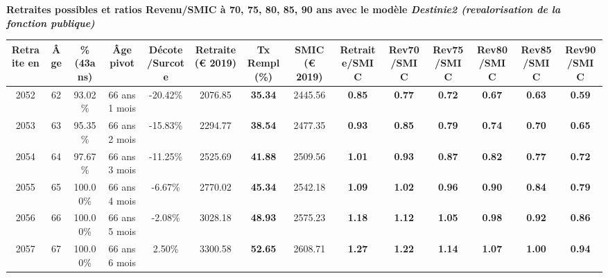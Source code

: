  \vspace{0.1cm} 
{\bf \noindent Retraites possibles et ratios Revenu/SMIC à 70, 75, 80, 85, 90 ans avec le modèle \emph{Destinie2 (revalorisation de la fonction publique)}}  
 
\begin{adjustbox}{max width=\textwidth} 
\begin{tabular}[htb]{|c|c||c|c|c||c|c||c||c|c|c|c|c|c|} 
\hline 
 Retraite en &  Âge &  \%(43ans) &  Âge pivot &  Décote/Surcote &  Retraite (\euro{} 2019) &  Tx Rempl(\%) &  SMIC (\euro{} 2019) &  Retraite/SMIC &  Rev70/SMIC &  Rev75/SMIC &  Rev80/SMIC &  Rev85/SMIC &  Rev90/SMIC \\ 
\hline \hline 
 2052 &  62 &  93.02\% &  66 ans 1 mois &  -20.42\% &  2076.85 &  {\bf 35.34} &  2445.56 &  {\bf {\color{red} 0.85}} &  {\bf {\color{red} 0.77}} &  {\bf {\color{red} 0.72}} &  {\bf {\color{red} 0.67}} &  {\bf {\color{red} 0.63}} &  {\bf {\color{red} 0.59}} \\ 
\hline 
 2053 &  63 &  95.35\% &  66 ans 2 mois &  -15.83\% &  2294.77 &  {\bf 38.54} &  2477.35 &  {\bf {\color{red} 0.93}} &  {\bf {\color{red} 0.85}} &  {\bf {\color{red} 0.79}} &  {\bf {\color{red} 0.74}} &  {\bf {\color{red} 0.70}} &  {\bf {\color{red} 0.65}} \\ 
\hline 
 2054 &  64 &  97.67\% &  66 ans 3 mois &  -11.25\% &  2525.69 &  {\bf 41.88} &  2509.56 &  {\bf 1.01} &  {\bf {\color{red} 0.93}} &  {\bf {\color{red} 0.87}} &  {\bf {\color{red} 0.82}} &  {\bf {\color{red} 0.77}} &  {\bf {\color{red} 0.72}} \\ 
\hline 
 2055 &  65 &  100.00\% &  66 ans 4 mois &  -6.67\% &  2770.02 &  {\bf 45.34} &  2542.18 &  {\bf 1.09} &  {\bf 1.02} &  {\bf {\color{red} 0.96}} &  {\bf {\color{red} 0.90}} &  {\bf {\color{red} 0.84}} &  {\bf {\color{red} 0.79}} \\ 
\hline 
 2056 &  66 &  100.00\% &  66 ans 5 mois &  -2.08\% &  3028.18 &  {\bf 48.93} &  2575.23 &  {\bf 1.18} &  {\bf 1.12} &  {\bf 1.05} &  {\bf {\color{red} 0.98}} &  {\bf {\color{red} 0.92}} &  {\bf {\color{red} 0.86}} \\ 
\hline 
 2057 &  67 &  100.00\% &  66 ans 6 mois &  2.50\% &  3300.58 &  {\bf 52.65} &  2608.71 &  {\bf 1.27} &  {\bf 1.22} &  {\bf 1.14} &  {\bf 1.07} &  {\bf 1.00} &  {\bf {\color{red} 0.94}} \\ 
\hline 
\hline 
\end{tabular} 
\end{adjustbox} 
 
 \vspace{0.1cm} 

